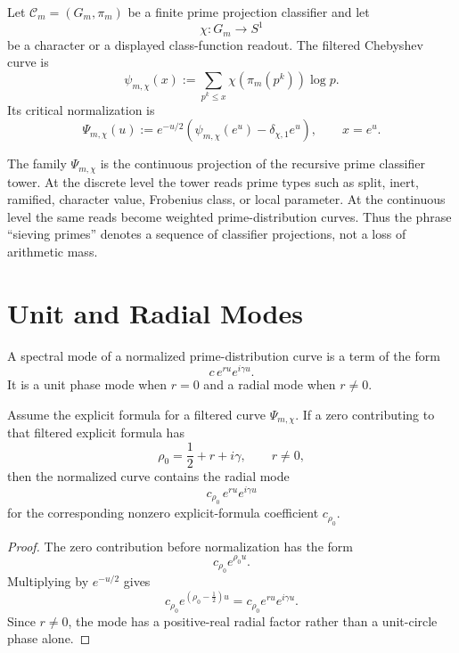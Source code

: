 \begin{definition}
\label{def:rh-filtered-chebyshev-curve}
Let $\mathcal C_m=(G_m,\pi_m)$ be a finite prime projection classifier
and let
$$
\chi:G_m\to S^1
$$
be a character or a displayed class-function readout.  The filtered
Chebyshev curve is
$$
\psi_{m,\chi}(x)
:=
\sum_{p^k\le x}\chi(\pi_m(p^k))\log p.
$$
Its critical normalization is
$$
\Psi_{m,\chi}(u)
:=
e^{-u/2}
\left(
\psi_{m,\chi}(e^u)-\delta_{\chi,1}e^u
\right),
\qquad
x=e^u.
$$
\end{definition}

\begin{principle}
\label{prin:rh-prime-filtering-is-projection}
The family $\Psi_{m,\chi}$ is the continuous projection of the recursive
prime classifier tower.  At the discrete level the tower reads prime
types such as split, inert, ramified, character value, Frobenius class,
or local parameter.  At the continuous level the same reads become
weighted prime-distribution curves.  Thus the phrase ``sieving primes''
denotes a sequence of classifier projections, not a loss of arithmetic
mass.
\end{principle}

\section{Unit and Radial Modes}
\label{sec:rh-prime-distribution-unit-radial-modes}

\begin{definition}
\label{def:rh-prime-distribution-spectral-mode}
A spectral mode of a normalized prime-distribution curve is a term of
the form
$$
c\,e^{ru}e^{i\gamma u}.
$$
It is a unit phase mode when $r=0$ and a radial mode when $r\ne0$.
\end{definition}

\begin{theorem}
\label{thm:rh-offcritical-zero-produces-radial-distribution-mode}
Assume the explicit formula for a filtered curve
$\Psi_{m,\chi}$.  If a zero contributing to that filtered explicit
formula has
$$
\rho_0=\frac12+r+i\gamma,
\qquad
r\ne0,
$$
then the normalized curve contains the radial mode
$$
c_{\rho_0}\,e^{ru}e^{i\gamma u}
$$
for the corresponding nonzero explicit-formula coefficient
$c_{\rho_0}$.
\end{theorem}

\begin{proof}
The zero contribution before normalization has the form
$$
c_{\rho_0}e^{\rho_0u}.
$$
Multiplying by $e^{-u/2}$ gives
$$
c_{\rho_0}e^{(\rho_0-\frac12)u}
=
c_{\rho_0}e^{ru}e^{i\gamma u}.
$$
Since $r\ne0$, the mode has a positive-real radial factor rather than a
unit-circle phase alone.
\end{proof}

